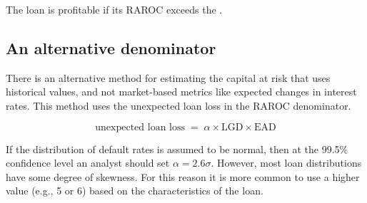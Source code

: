 \begin{crkeybox}
The loan is profitable if its RAROC exceeds the .
\end{crkeybox}

\subsection*{An alternative denominator}

There is an alternative method for estimating the capital at risk that uses
historical values, and not market-based metrics like expected changes in interest
rates. This method uses the unexpected loan loss in the RAROC denominator.

\begin{crfmlbox}
\[ \text{unexpected loan loss} \;=\; \alpha \times \mathrm{LGD} \times \mathrm{EAD} \]
\end{crfmlbox}

If the distribution of default rates is assumed to be normal, then at the 99.5\%
confidence level an analyst should set $\alpha = 2.6\sigma$. However, most loan
distributions have some degree of skewness. For this reason it is more common to
use a higher value (e.g., 5 or 6) based on the characteristics of the loan.
